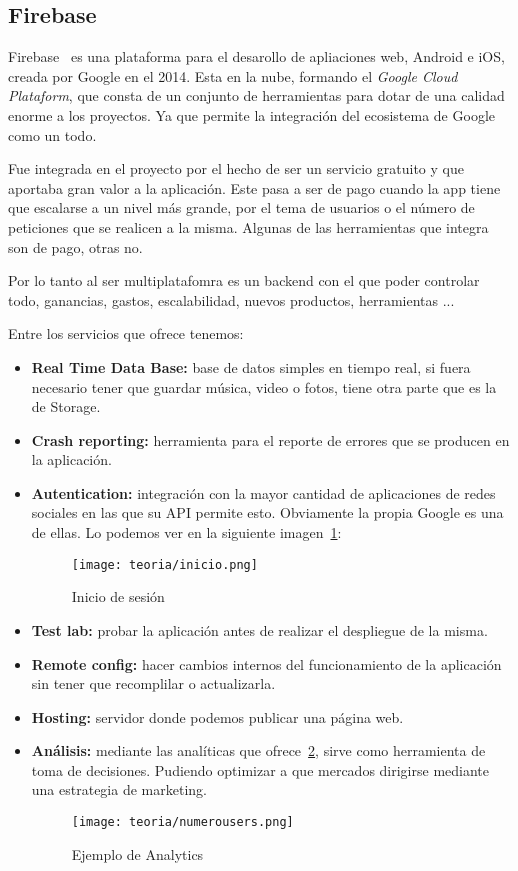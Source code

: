 \subsection{Firebase}
Firebase~\cite{wiki:firebase} es una plataforma para el desarollo de apliaciones web, Android e iOS, creada por Google en el 2014. Esta en la nube, formando el \emph{Google Cloud Plataform}, que consta de un conjunto de herramientas para dotar de una calidad enorme a los proyectos. Ya que permite la integración del ecosistema de Google como un todo.

Fue integrada en el proyecto por el hecho de ser un servicio gratuito y que aportaba gran valor a la aplicación. Este pasa a ser de pago cuando la app tiene que escalarse a un nivel más grande, por el tema de usuarios o el número de peticiones que se realicen a la misma. Algunas de las herramientas que integra son de pago, otras no.

Por lo tanto al ser multiplatafomra es un backend con el que poder controlar todo, ganancias, gastos, escalabilidad, nuevos productos, herramientas ... 

Entre los servicios que ofrece tenemos:

\begin{itemize}
	\item \textbf{Real Time Data Base:} base de datos simples en tiempo real, si fuera necesario tener que guardar música, video o fotos, tiene otra parte que es la de Storage.
	\item \textbf{Crash reporting:} herramienta para el reporte de errores que se producen en la aplicación.
	\item \textbf{Autentication:} integración con la mayor cantidad de aplicaciones de redes sociales en las que su API permite esto. Obviamente la propia Google es una de ellas. Lo podemos ver en la siguiente imagen~\ref{fig:inicio}:
	\begin{figure}[H]
		\centering
		\texttt{[image: teoria/inicio.png]}
		\caption{Inicio de sesión}\label{fig:inicio}
	\end{figure}
	\item \textbf{Test lab:} probar la aplicación antes de realizar el despliegue de la misma.
	\item \textbf{Remote config:} hacer cambios internos del funcionamiento de la aplicación sin tener que recomplilar o actualizarla.
	\item \textbf{Hosting:} servidor donde podemos publicar una página web.
	\item \textbf{Análisis:} mediante las analíticas que ofrece~\ref{fig:numerousers}, sirve como herramienta de toma de decisiones. Pudiendo optimizar a que mercados dirigirse mediante una estrategia de marketing.
	\begin{figure}[H]
		\centering
		\texttt{[image: teoria/numerousers.png]}
		\caption{Ejemplo de Analytics}\label{fig:numerousers}
	\end{figure}
\end{itemize}
